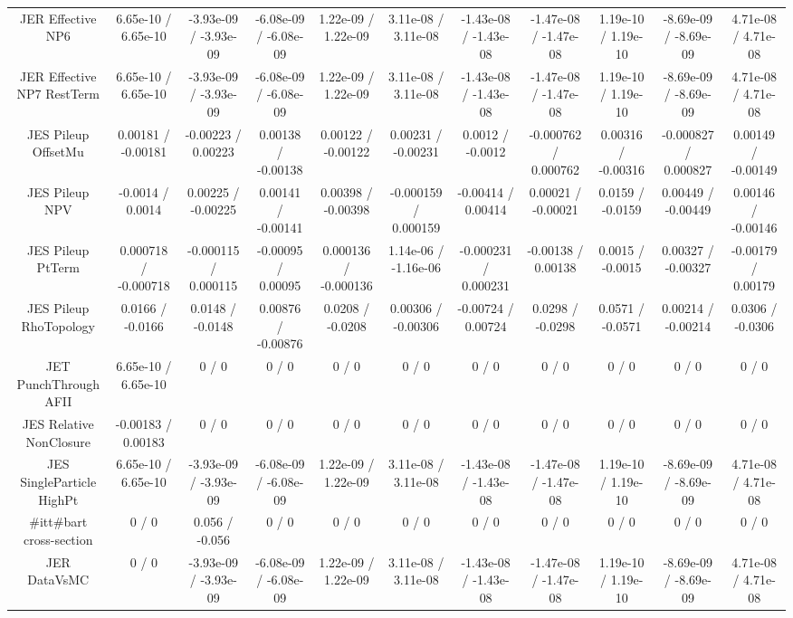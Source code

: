 \begin{table}[htbp]
\begin{center}
\begin{tabular}{|c|c|c|c|c|c|c|c|c|c|c|}
  JER Effective NP6 & 6.65e-10 / 6.65e-10 & -3.93e-09 / -3.93e-09 & -6.08e-09 / -6.08e-09 & 1.22e-09 / 1.22e-09 & 3.11e-08 / 3.11e-08 & -1.43e-08 / -1.43e-08 & -1.47e-08 / -1.47e-08 & 1.19e-10 / 1.19e-10 & -8.69e-09 / -8.69e-09 & 4.71e-08 / 4.71e-08 \\ 
  JER Effective NP7 RestTerm & 6.65e-10 / 6.65e-10 & -3.93e-09 / -3.93e-09 & -6.08e-09 / -6.08e-09 & 1.22e-09 / 1.22e-09 & 3.11e-08 / 3.11e-08 & -1.43e-08 / -1.43e-08 & -1.47e-08 / -1.47e-08 & 1.19e-10 / 1.19e-10 & -8.69e-09 / -8.69e-09 & 4.71e-08 / 4.71e-08 \\ 
  JES Pileup OffsetMu & 0.00181 / -0.00181 & -0.00223 / 0.00223 & 0.00138 / -0.00138 & 0.00122 / -0.00122 & 0.00231 / -0.00231 & 0.0012 / -0.0012 & -0.000762 / 0.000762 & 0.00316 / -0.00316 & -0.000827 / 0.000827 & 0.00149 / -0.00149 \\ 
  JES Pileup NPV & -0.0014 / 0.0014 & 0.00225 / -0.00225 & 0.00141 / -0.00141 & 0.00398 / -0.00398 & -0.000159 / 0.000159 & -0.00414 / 0.00414 & 0.00021 / -0.00021 & 0.0159 / -0.0159 & 0.00449 / -0.00449 & 0.00146 / -0.00146 \\ 
  JES Pileup PtTerm & 0.000718 / -0.000718 & -0.000115 / 0.000115 & -0.00095 / 0.00095 & 0.000136 / -0.000136 & 1.14e-06 / -1.16e-06 & -0.000231 / 0.000231 & -0.00138 / 0.00138 & 0.0015 / -0.0015 & 0.00327 / -0.00327 & -0.00179 / 0.00179 \\ 
  JES Pileup RhoTopology & 0.0166 / -0.0166 & 0.0148 / -0.0148 & 0.00876 / -0.00876 & 0.0208 / -0.0208 & 0.00306 / -0.00306 & -0.00724 / 0.00724 & 0.0298 / -0.0298 & 0.0571 / -0.0571 & 0.00214 / -0.00214 & 0.0306 / -0.0306 \\ 
  JET PunchThrough AFII & 6.65e-10 / 6.65e-10 & 0 / 0 & 0 / 0 & 0 / 0 & 0 / 0 & 0 / 0 & 0 / 0 & 0 / 0 & 0 / 0 & 0 / 0 \\ 
  JES Relative NonClosure & -0.00183 / 0.00183 & 0 / 0 & 0 / 0 & 0 / 0 & 0 / 0 & 0 / 0 & 0 / 0 & 0 / 0 & 0 / 0 & 0 / 0 \\ 
  JES SingleParticle HighPt & 6.65e-10 / 6.65e-10 & -3.93e-09 / -3.93e-09 & -6.08e-09 / -6.08e-09 & 1.22e-09 / 1.22e-09 & 3.11e-08 / 3.11e-08 & -1.43e-08 / -1.43e-08 & -1.47e-08 / -1.47e-08 & 1.19e-10 / 1.19e-10 & -8.69e-09 / -8.69e-09 & 4.71e-08 / 4.71e-08 \\ 
  #it{t#bar{t}} cross-section & 0 / 0 & 0.056 / -0.056 & 0 / 0 & 0 / 0 & 0 / 0 & 0 / 0 & 0 / 0 & 0 / 0 & 0 / 0 & 0 / 0 \\ 
  JER DataVsMC & 0 / 0 & -3.93e-09 / -3.93e-09 & -6.08e-09 / -6.08e-09 & 1.22e-09 / 1.22e-09 & 3.11e-08 / 3.11e-08 & -1.43e-08 / -1.43e-08 & -1.47e-08 / -1.47e-08 & 1.19e-10 / 1.19e-10 & -8.69e-09 / -8.69e-09 & 4.71e-08 / 4.71e-08 \\ 

\end{tabular}
\end{center}
\end{table}
